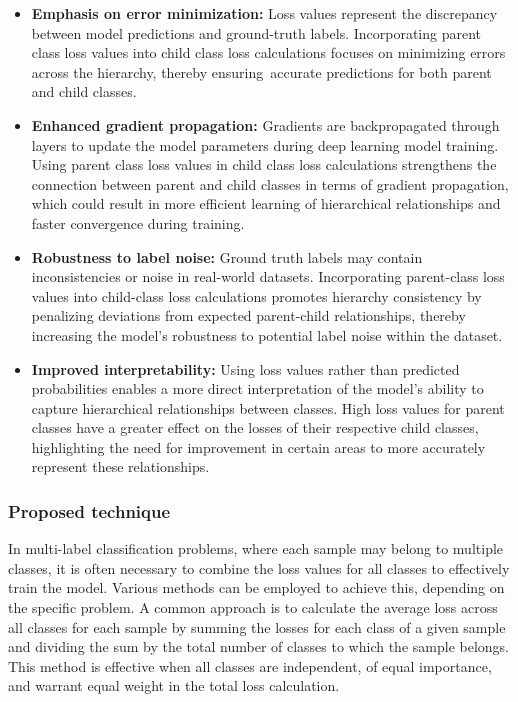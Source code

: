 \begin{itemize}
    \item \textbf{Emphasis on error minimization: }Loss values represent the discrepancy between model predictions and ground-truth labels. Incorporating parent class loss values into child class loss calculations focuses on minimizing errors across the hierarchy, thereby ensuring~accurate predictions for both parent and child classes.

    \item \textbf{Enhanced gradient propagation:} Gradients are backpropagated through layers to update the model parameters during deep learning model training. Using parent class loss values in child class loss calculations strengthens the connection between parent and child classes in terms of gradient propagation, which could result in more efficient learning of hierarchical relationships and faster convergence during training.

    \item \textbf{Robustness to label noise:} Ground truth labels may contain inconsistencies or noise in real-world datasets. Incorporating parent-class loss values into child-class loss calculations promotes hierarchy consistency by penalizing deviations from expected parent-child relationships, thereby increasing the model's robustness to potential label noise within the dataset.

    \item \textbf{Improved interpretability:} Using loss values rather than predicted probabilities enables a more direct interpretation of the model's ability to capture hierarchical relationships between classes. High loss values for parent classes have a greater effect on the losses of their respective child classes, highlighting the need for improvement in certain areas to more accurately represent these relationships.
\end{itemize}

\subsubsection{Proposed technique}

In multi-label classification problems, where each sample may belong to multiple classes, it is often necessary to combine the loss values for all classes to effectively train the model. Various methods can be employed to achieve this, depending on the specific problem. A common approach is to calculate the average loss across all classes for each sample by summing the losses for each class of a given sample and dividing the sum by the total number of classes to which the sample belongs. This method is effective when all classes are independent, of equal importance, and warrant equal weight in the total loss calculation.

